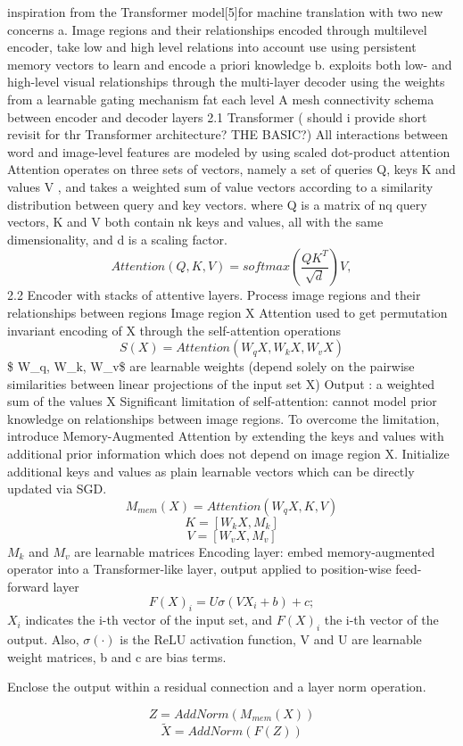 \documentclass[
]{krantz}
\begin{document}
inspiration from the Transformer model{[}5{]}for machine translation with two new concerns
a. Image regions and their relationships encoded through multilevel encoder, take low and high level relations into account
use using persistent memory vectors to learn and encode a priori knowledge
b. exploits both low- and high-level visual relationships through the multi-layer decoder using the weights from a learnable gating mechanism fat each level
A mesh connectivity schema between encoder and decoder layers
2.1 Transformer ( should i provide short revisit for thr Transformer architecture? THE BASIC?)
All interactions between word and image-level features are modeled by using scaled dot-product attention
Attention operates on three sets of vectors, namely a set of queries Q, keys K and values V , and takes a weighted sum of value vectors according to a similarity distribution between query and key vectors.
where Q is a matrix of nq query vectors, K and V both contain nk keys and values, all with the same dimensionality, and d is a scaling factor.
\[ Attention(Q, K, V) = softmax(\frac{QK^T}{\sqrt{d}}) V, \]
2.2 Encoder with stacks of attentive layers.
Process image regions and their relationships between regions
Image region X
Attention used to get permutation invariant encoding of X through the self-attention operations
\[ S(X) = Attention(W_q X, W_k X, W_vX) \]
\$ W\_q, W\_k, W\_v\$ are learnable weights (depend solely on the pairwise similarities between linear projections of the input set X)
Output : a weighted sum of the values X
Significant limitation of self-attention: cannot model prior knowledge on relationships between image regions.
To overcome the limitation, introduce Memory-Augmented Attention by extending the keys and values with additional prior information which does not depend on image region X.
Initialize additional keys and values as plain learnable vectors which can be directly updated via SGD.
\[M_{mem}(X) = Attention(W_qX, K, V )\]
\[K = [W_kX,M_k]\]
\[V =[W_vX,M_v]\]
\(M_k\) and \(M_v\) are learnable matrices
Encoding layer: embed memory-augmented operator into a Transformer-like layer, output applied to position-wise feed-forward layer
\[ F(X)_i= U\sigma(V X_i +b)+c;\]
\(X_i\) indicates the i-th vector of the input set, and \(F(X)_i\) the i-th vector of the output. Also, \(\sigma(·)\) is the ReLU activation function, V and U are learnable weight matrices, b and c are bias terms.

Enclose the output within a residual connection and a layer norm operation.

\[ Z = AddNorm(M_{mem}(X))\]
\[ \tilde{X}=AddNorm(F(Z))\]
\end{document}
